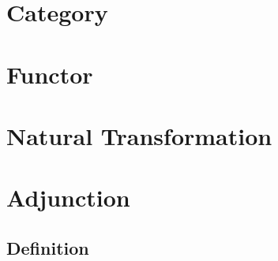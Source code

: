 \section{Category}
\section{Functor}
\section{Natural Transformation}
\section{Adjunction}
    \subsection{Definition}
        
